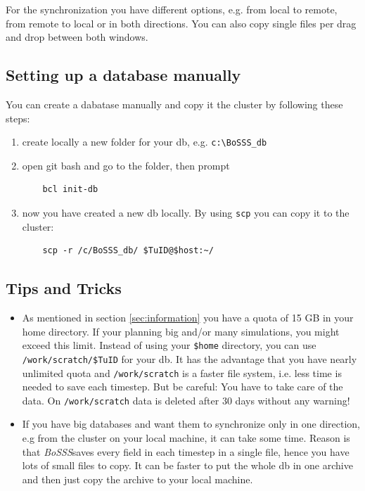 \documentclass[11pt,twoside,a4paper]{fdyartcl}
\newcommand{\Bosss}{\textit{BoSSS}}
\begin{document}
For the synchronization you have different options, e.g. from local to remote, from remote to local or in both directions.
You can also copy single files per drag and drop between both windows.

\subsection{Setting up a database manually}
\label{sec:setup_db}
You can create a dabatase manually and copy it the cluster by following these steps:
\begin{enumerate}
	\item create locally a new folder for your db, e.g. \verb|c:\BoSSS_db|
	\item open git bash and go to the folder, then prompt
	\begin{verbatim}
	bcl init-db
	\end{verbatim}
	\item now you have created a new db locally. By using \verb|scp| you can copy it to the cluster:
	\begin{verbatim}
	scp -r /c/BoSSS_db/ $TuID@$host:~/
	\end{verbatim}
\end{enumerate}

\subsection{Tips and Tricks}
\label{sec:tips}
\begin{itemize}
\item As mentioned in section \ref{sec:information} you have a quota of 15 GB in your home directory. If your planning big and/or many simulations, you might exceed this limit. Instead of using your \verb|$home| directory, you can use \verb|/work/scratch/$TuID| for your db. It has the advantage that you have nearly unlimited quota and \verb|/work/scratch| is a faster file system, i.e. less time is needed to save each timestep. But be careful: You have to take care of the data. On \verb|/work/scratch| data is deleted after 30 days without any warning!
\item If you have big databases and want them to synchronize only in one direction, e.g from the cluster on your local machine, it can take some time. Reason is that \Bosss saves every field in each timestep in a single file, hence you have lots of small files to copy. It can be faster to put the whole db in one archive and then just copy the archive to your local machine.
\end{itemize}
\end{document}

